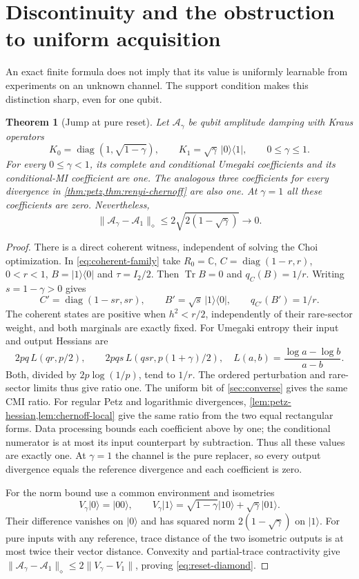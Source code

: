 \documentclass[11pt]{article}
\numberwithin{equation}{section}
\newtheorem{theorem}{Theorem}[section]
\theoremstyle{definition}
\theoremstyle{remark}
\DeclareMathOperator{\Tr}{Tr}
\DeclareMathOperator{\diag}{diag}
\newcommand{\ket}[1]{\lvert #1\rangle}
\newcommand{\bra}[1]{\langle #1\rvert}
\newcommand{\norm}[1]{\lVert #1\rVert}
\begin{document}
\section{Discontinuity and the obstruction to uniform acquisition}
\label{sec:acquisition}

An exact finite formula does not imply that its value is uniformly learnable
from experiments on an unknown channel. The support condition makes this
distinction sharp, even for one qubit.

\begin{theorem}[Jump at pure reset]
\label{thm:reset-jump}
Let $\mathcal A_\gamma$ be qubit amplitude damping with Kraus operators
\[
 K_0=\diag(1,\sqrt{1-\gamma}),\qquad
 K_1=\sqrt\gamma\,\ket0\bra1,\qquad 0\leq\gamma\leq1.
\]
For every $0\leq\gamma<1$, its complete and conditional Umegaki
coefficients and its conditional-MI coefficient are one. The analogous
three coefficients for every divergence in
\cref{thm:petz,thm:renyi-chernoff} are also one. At $\gamma=1$ all these
coefficients are zero. Nevertheless,
\begin{equation}
 \norm{\mathcal A_\gamma-\mathcal A_1}_\diamond
 \leq2\sqrt{2(1-\sqrt\gamma)}\longrightarrow0.
 \label{eq:reset-diamond}
\end{equation}
\end{theorem}
\begin{proof}
There is a direct coherent witness, independent of solving the Choi
optimization. In \eqref{eq:coherent-family} take
$R_0=\mathbb C$, $C=\diag(1-r,r)$, $0<r<1$,
$B=\ket1\bra0$ and $\tau=I_2/2$. Then $\Tr B=0$ and
$q_C(B)=1/r$. Writing $s=1-\gamma>0$ gives
\[
 C'=\diag(1-sr,sr),\qquad B'=\sqrt s\,\ket1\bra0,
 \qquad q_{C'}(B')=1/r.
\]
The coherent states are positive when $h^2<r/2$, independently of
their rare-sector weight, and both marginals are exactly fixed.
For Umegaki entropy their input and output Hessians are
\[
 2pq\,L(qr,p/2),\qquad
 2pqs\,L(qsr,p(1+\gamma)/2),
 \quad L(a,b)=\frac{\log a-\log b}{a-b}.
\]
Both, divided by $2p\log(1/p)$, tend to $1/r$.
The ordered perturbation and rare-sector limits thus give ratio one.
The uniform bit of \cref{sec:converse} gives the same CMI ratio.
For regular Petz and logarithmic divergences,
\cref{lem:petz-hessian,lem:chernoff-local} give the same ratio from
the two equal rectangular forms. Data processing bounds each
coefficient above by one; the conditional numerator is at most its
input counterpart by subtraction. Thus all these values are exactly
one. At $\gamma=1$ the channel is the pure replacer, so every output
divergence equals the reference divergence and each coefficient is zero.

For the norm bound use a common environment and isometries
\[
 V_\gamma\ket0=\ket{00},\qquad
 V_\gamma\ket1=\sqrt{1-\gamma}\ket{10}
                          +\sqrt\gamma\ket{01}.
\]
Their difference vanishes on $\ket0$ and has squared norm
$2(1-\sqrt\gamma)$ on $\ket1$.
For pure inputs with any reference, trace distance of the two
isometric outputs is at most twice their vector distance.
Convexity and partial-trace contractivity give
$\norm{\mathcal A_\gamma-\mathcal A_1}_\diamond
\leq2\norm{V_\gamma-V_1}$, proving
\eqref{eq:reset-diamond}.
\end{proof}
\end{document}
